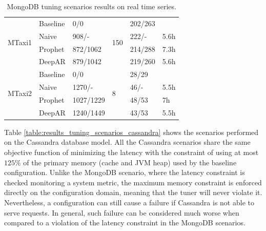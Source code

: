\documentclass[a4paper, 12pt]{article} %
\begin{document}
\begin{table}
\begin{tabularx}{\textwidth}{@{}XXXXXX@{}}
			\midrule
			\multirow{4}{*}{MTaxi1}
			& Baseline & 0/0 & \multirow{4}{*}{150} & 202/263 & \\
			& Naive & 908/- && 222/- & 5.6h \\
			& Prophet & 872/1062 && 214/288 & 7.3h\\
			& DeepAR & 879/1042 && 219/260 & 5.6h\\
			
			\midrule
			\multirow{4}{*}{MTaxi2}
			& Baseline & 0/0 & \multirow{4}{*}{8} & 28/29 & \\
			& Naive & 1270/- && 46/- & 5.5h \\
			& Prophet & 1027/1229 && 48/53 & 7h\\
			& DeepAR & 1240/1449 && 43/53 & 5.5h\\
			
			
			\bottomrule
		\end{tabularx}
		\caption{MongoDB tuning scenarios results on real time series.} \label{table:results_mongo_real}
	\end{table}

	
	Table \ref{table:results_tuning_scenarios_cassandra} shows the scenarios performed on the Cassandra database model. All the Cassandra scenarios share the same objective function of minimizing the latency with the constraint of using at most $125\%$ of the primary memory (cache and JVM heap) used by the baseline configuration. Unlike the MongoDB scenario, where the latency constraint is checked monitoring a system metric, the maximum memory constraint is enforced directly on the configuration domain, meaning that the tuner will never violate it. Nevertheless, a configuration can still cause a failure if Cassandra is not able to serve requests. In general, such failure can be considered much worse when compared to a violation of the latency constraint in the MongoDB scenarios.
	
\end{document}
